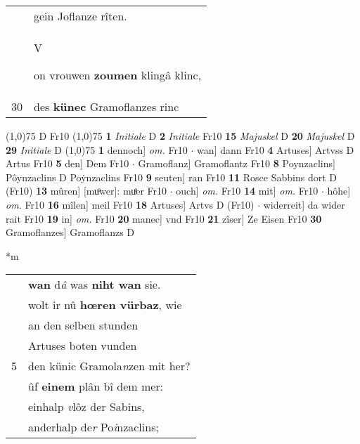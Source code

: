 \documentclass[8pt,a4paper,notitlepage]{article}
\begin{document}
\begin{table}[ht]
\begin{minipage}[t]{0.5\linewidth}
\begin{tabular}{rl}
 & gein Joflanze rîten.\\ 
 & \begin{large}V\end{large}on vrouwen \textbf{zoumen} klingâ klinc,\\ 
30 & des \textbf{künec} Gramoflanzes rinc\\ 
\end{tabular}
\scriptsize
\line(1,0){75} \newline
D Fr10 \newline
\line(1,0){75} \newline
\textbf{1} \textit{Initiale} D  \textbf{2} \textit{Initiale} Fr10  \textbf{15} \textit{Majuskel} D  \textbf{20} \textit{Majuskel} D  \textbf{29} \textit{Initiale} D  \newline
\line(1,0){75} \newline
\textbf{1} dennoch] \textit{om.} Fr10  $\cdot$ wan] dann Fr10 \textbf{4} Artuses] Artvss D Artus Fr10 \textbf{5} den] Dem Fr10  $\cdot$ Gramoflanz] Gramoflantz Fr10 \textbf{8} Poynzaclins] Pôynzaclins D Poẏnzaclins Fr10 \textbf{9} seuten] ran Fr10 \textbf{11} Rosce Sabbins dort D (Fr10) \textbf{13} mûren] [muͦwer]: muͦer Fr10  $\cdot$ ouch] \textit{om.} Fr10 \textbf{14} mit] \textit{om.} Fr10  $\cdot$ hôhe] \textit{om.} Fr10 \textbf{16} mîlen] meil Fr10 \textbf{18} Artuses] Artvs D (Fr10)  $\cdot$ widerreit] da wider rait Fr10 \textbf{19} in] \textit{om.} Fr10 \textbf{20} manec] vnd Fr10 \textbf{21} zîser] Ze Eisen Fr10 \textbf{30} Gramoflanzes] Gramoflanzs D \newline
\end{minipage}
\hspace{0.5cm}
\begin{minipage}[t]{0.5\linewidth}
\small
\begin{center}*m
\end{center}
\begin{tabular}{rl}
 & \textbf{wan} d\textit{â} was \textbf{niht wan} sie.\\ 
 & wolt ir nû \textbf{hœren vürbaz}, wie\\ 
 & an den selben stunden\\ 
 & Artuses boten vunden\\ 
5 & den künic Gramola\textit{n}zen mit her?\\ 
 & ûf \textbf{einem} plân bî dem mer:\\ 
 & einhalp \textit{v}lôz der Sabins,\\ 
 & anderhalp de\textit{r} Po\textit{i}nzaclins;\\ 

\end{tabular}
\end{minipage}
\end{table}
\end{document}
